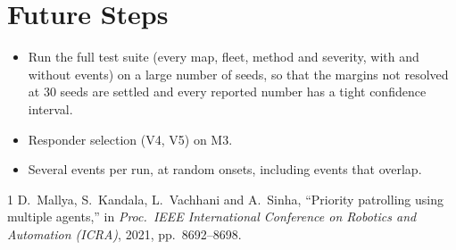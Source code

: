 \documentclass[11pt]{article}
\theoremstyle{definition}
\theoremstyle{plain}
\begin{document}
\section{Future Steps}
\begin{itemize}
\item Run the full test suite (every map, fleet, method and severity, with
and without events) on a large number of seeds, so that the margins not
resolved at 30 seeds are settled and every reported number has a tight
confidence interval.
\item Responder selection (V4, V5) on M3.
\item Several events per run, at random onsets, including events that
overlap.
\end{itemize}

\begin{thebibliography}{1}
 D.~Mallya, S.~Kandala, L.~Vachhani and A.~Sinha,
``Priority patrolling using multiple agents,'' in \emph{Proc.\ IEEE
International Conference on Robotics and Automation (ICRA)}, 2021,
pp.~8692--8698.
\end{thebibliography}
\end{document}

